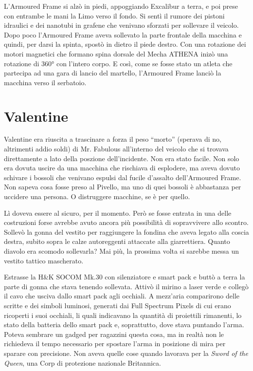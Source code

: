     L'Armoured Frame si alzò in piedi, appoggiando Excalibur a terra, e poi prese con entrambe le mani la Limo verso il
    fondo. Si sentì il rumore dei pistoni idraulici e dei nanotubi in grafene che venivano sforzati per sollevare il
    veicolo. Dopo poco l'Armoured Frame aveva sollevato la parte frontale della macchina e quindi, per darsi la spinta,
    spostò in dietro il piede destro. Con una rotazione dei motori magnetici che formano spina dorsale del Mecha ATHENA
    inizò una rotazione di 360° con l'intero corpo. E così, come se fosse stato un atleta che partecipa ad una gara di
    lancio del martello, l'Armoured Frame lanciò la macchina verso il serbatoio.

  \section*{Valentine}

    Valentine era riuscita a trascinare a forza il peso ``morto'' (sperava di no, altrimenti addio soldi) di Mr.
    Fabulous all'interno del veicolo che si trovava direttamente a lato della poszione dell'incidente. Non era stato
    facile. Non solo era dovuta uscire da una macchina che rischiava di esplodere, ma aveva dovuto schivare i bossoli
    che venivano espulsi dal fucile d'assalto dell'Armoured Frame. Non sapeva cosa fosse preso al Pivello, ma uno di
    quei bossoli è abbastanza per uccidere una persona. O distruggere macchine, se è per quello.

    Lì doveva essere al sicuro, per il momento. Però se fosse entrata in una delle costruzioni forse avrebbe avuto
    ancora più possibilità di sopravvivere allo scontro. Sollevò la gonna del vestito per raggiungere la fondina che
    aveva legato alla coscia destra, subito sopra le calze autoreggenti attaccate alla giarrettiera. Quanto diavolo era
    scomodo sollevarla? Mai più, la prossima volta si sarebbe messa un vestito tattico mascherato.

    Estrasse la H\&K SOCOM Mk.30 con silenziatore e smart pack e buttò a terra la parte di gonna che stava tenendo
    sollevata. Attivò il mirino a laser verde e collegò il cavo che usciva dallo smart pack agli occhiali. A mezz'aria
    comparirono delle scritte e dei simboli luminosi, generati dai Full Spectrum Pixels di cui erano ricoperti i suoi
    occhiali, li quali indicavano la quantità di proiettili rimanenti, lo stato della batteria dello smart pack e,
    soprattutto, dove stava puntando l'arma. Poteva sembrare un gadged per ragazzini questa cosa, ma in realtà non le
    richiedeva il tempo necessario per spostare l'arma in posizione di mira per sparare con precisione. Non aveva quelle
    cose quando lavorava per la \emph{Sword of the Queen}, una Corp di protezione nazionale Britannica.

